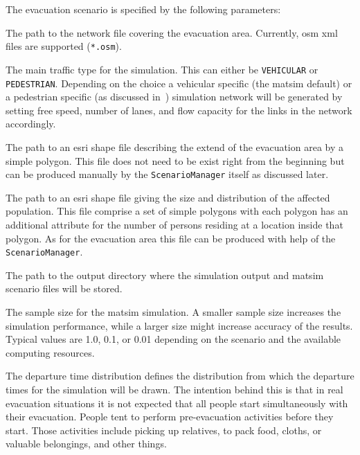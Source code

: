 The evacuation scenario is specified by the following parameters:
\begin{compactitem}
\item The path to the network file covering the evacuation area. Currently, \gls{osm} \gls{xml} files are supported (\lstinline|*.osm|).
\item The main traffic type for the simulation. This can either be \lstinline|VEHICULAR| or \lstinline|PEDESTRIAN|. Depending on the choice a vehicular specific (the \gls{matsim} default) or a pedestrian specific (as discussed in~\citet{LaemmelKluepfelNagel2009EvacPadangAtBookTimmermanns,Laemmel_PhDThesis_2011}) simulation network will be generated by setting free speed, number of lanes, and flow capacity for the links in the network accordingly.
\item The path to an \gls{esri} shape file describing the extend of the evacuation area by a simple polygon. This file does not need to be exist right from the beginning but can be produced manually by the \lstinline|ScenarioManager| itself as discussed later.
\item The path to an \gls{esri} shape file giving the size and distribution of the affected population. This file comprise a set of simple polygons with each polygon has an additional attribute for the number of persons residing at a location inside that polygon. As for the evacuation area this file can be produced with help of the \lstinline|ScenarioManager|.
\item The path to the output directory where the simulation output and \gls{matsim} scenario files will be stored.
\item The sample size for the \gls{matsim} simulation. A smaller sample size increases the simulation performance, while a larger size might increase accuracy of the results. Typical values are 1.0, 0.1, or 0.01 depending on the scenario and the available computing resources.
\item The departure time distribution defines the distribution from which the departure times for the simulation will be drawn. The intention behind this is that in real evacuation situations it is not expected that all people start simultaneously with their evacuation. 
People tent to perform pre-evacuation activities before they start. Those activities include picking up relatives, to pack food, cloths, or valuable belongings, and other things. 

\end{compactitem}
